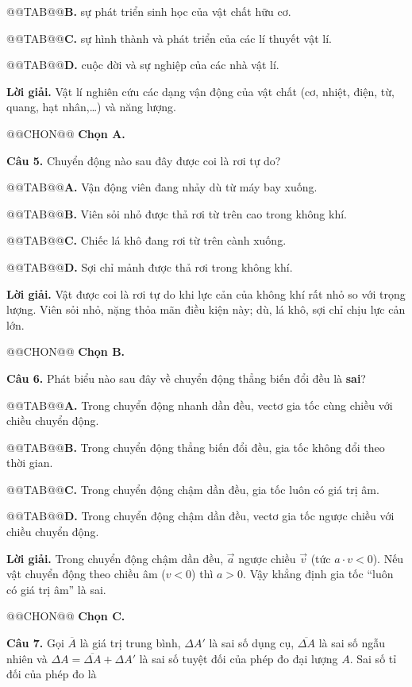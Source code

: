 \documentclass{article}
\begin{document}
@@TAB@@\textbf{B.} sự phát triển sinh học của vật chất hữu cơ.

@@TAB@@\textbf{C.} sự hình thành và phát triển của các lí thuyết vật lí.

@@TAB@@\textbf{D.} cuộc đời và sự nghiệp của các nhà vật lí.

\textbf{Lời giải.} Vật lí nghiên cứu các dạng vận động của vật chất (cơ, nhiệt, điện, từ, quang, hạt nhân,\ldots) và năng lượng.

@@CHON@@ \textbf{Chọn A.}

\textbf{Câu 5.} Chuyển động nào sau đây được coi là rơi tự do?

@@TAB@@\textbf{A.} Vận động viên đang nhảy dù từ máy bay xuống.

@@TAB@@\textbf{B.} Viên sỏi nhỏ được thả rơi từ trên cao trong không khí.

@@TAB@@\textbf{C.} Chiếc lá khô đang rơi từ trên cành xuống.

@@TAB@@\textbf{D.} Sợi chỉ mảnh được thả rơi trong không khí.

\textbf{Lời giải.} Vật được coi là rơi tự do khi lực cản của không khí rất nhỏ so với trọng lượng. Viên sỏi nhỏ, nặng thỏa mãn điều kiện này; dù, lá khô, sợi chỉ chịu lực cản lớn.

@@CHON@@ \textbf{Chọn B.}

\textbf{Câu 6.} Phát biểu nào sau đây về chuyển động thẳng biến đổi đều là \textbf{sai}?

@@TAB@@\textbf{A.} Trong chuyển động nhanh dần đều, vectơ gia tốc cùng chiều với chiều chuyển động.

@@TAB@@\textbf{B.} Trong chuyển động thẳng biến đổi đều, gia tốc không đổi theo thời gian.

@@TAB@@\textbf{C.} Trong chuyển động chậm dần đều, gia tốc luôn có giá trị âm.

@@TAB@@\textbf{D.} Trong chuyển động chậm dần đều, vectơ gia tốc ngược chiều với chiều chuyển động.

\textbf{Lời giải.} Trong chuyển động chậm dần đều, $\vec{a}$ ngược chiều $\vec{v}$ (tức $a \cdot v < 0$). Nếu vật chuyển động theo chiều âm ($v < 0$) thì $a > 0$. Vậy khẳng định gia tốc ``luôn có giá trị âm'' là sai.

@@CHON@@ \textbf{Chọn C.}

\textbf{Câu 7.} Gọi $\overline{A}$ là giá trị trung bình, $\Delta A'$ là sai số dụng cụ, $\overline{\Delta A}$ là sai số ngẫu nhiên và $\Delta A = \overline{\Delta A} + \Delta A'$ là sai số tuyệt đối của phép đo đại lượng $A$. Sai số tỉ đối của phép đo là
\end{document}
